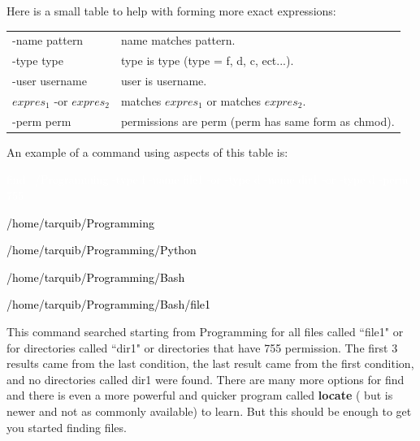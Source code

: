 \documentclass[oneside]{book}
\newcommand{\commandline}[1]{\begin{center} \colorbox{Dark}{\textcolor{white}{#1}} \end{center}}
\newcommand{\exampleout}[1]{\begin{center} \colorbox{Light}{\textcolor{black}{#1}} \end{center}}
\begin{document}
    Here is a small table to help with forming more exact expressions:
    \begin{center}
        \begin{tabular}{|l|l|}
         \hline
        -name pattern & name matches pattern. \\
        -type type & type is type (type = f, d, c, ect...). \\
        -user username & user is username. \\ 
        $expres_1$ -or $expres_2$ & matches $expres_1$ or matches $expres_2$. \\
        -perm perm & permissions are perm (perm has same form as chmod). \\ \hline
    \end{tabular}
    \end{center}
    An example of a command using aspects of this table is:
    \commandline{find ~/Programming -type f -name file1 -or -type d -name dir1 -or -type d -perm 755} 
    \exampleout{/home/tarquib/Programming}
    \exampleout{/home/tarquib/Programming/Python}
    \exampleout{/home/tarquib/Programming/Bash}
    \exampleout{/home/tarquib/Programming/Bash/file1}
    This command searched starting from Programming for all files called ``file1" or for directories called ``dir1" or directories that have 755 permission. The first 3 results came from the last condition, the last result came from the first condition, and no directories called dir1 were found. There are many more options for find and there is even a more powerful and quicker program called \textbf{locate} ( but is newer and not as commonly available) to learn. But this should be enough to get you started finding files. 
\end{document}

